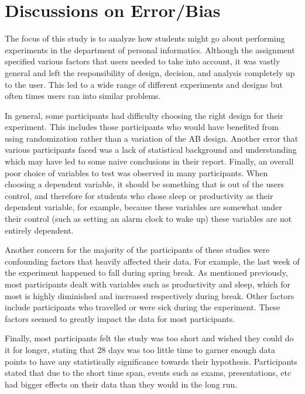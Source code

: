\section{Discussions on Error/Bias}

The focus of this study is to analyze how students might go about performing experiments in the department of personal informatics. Although the assignment specified various factors that users needed to take into account, it was vastly general and left the responsibility of design, decision, and analysis completely up to the user. This led to a wide range of different experiments and designs but often times users ran into similar problems.


In general, some participants had difficulty choosing the right design for their experiment. This includes those participants who would have benefited from using randomization rather than a variation of the AB design. Another error that various participants faced was a lack of statistical background and understanding which may have led to some naive conclusions in their report. Finally, an overall poor choice of variables to test was observed in many participants. When choosing a dependent variable, it should be something that is out of the user\textquotesingle s control, and therefore for students who chose sleep or productivity as their dependent variable, for example, because these variables are somewhat under their control (such as setting an alarm clock to wake up) these variables are not entirely dependent.  

Another concern for the majority of the participants of these studies were confounding factors that heavily affected their data. For example, the last week of the experiment happened to fall during spring break. As mentioned previously, most participants dealt with variables such as productivity and sleep, which for most is highly diminished and increased respectively during break. Other factors include participants who travelled or were sick during the experiment. These factors seemed to greatly impact the data for most participants.

Finally, most participants felt the study was too short and wished they could do it for longer, stating that 28 days was too little time to garner enough data points to have any statistically significance towards their hypothesis. Participants stated that due to the short time span, events such as exams, presentations, etc had bigger effects on their data than they would in the long run. 
